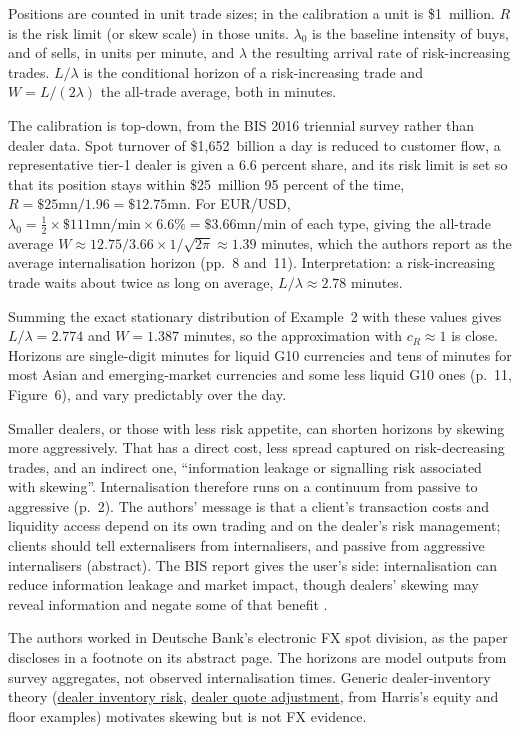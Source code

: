 \begin{qfmodel}
 Positions are counted in unit trade sizes; in the calibration a unit is \$1~million. $R$ is the risk limit (or skew scale) in those units. $\lambda_0$ is the baseline intensity of buys, and of sells, in units per minute, and $\lambda$ the resulting arrival rate of risk-increasing trades. $L/\lambda$ is the conditional horizon of a risk-increasing trade and $W=L/(2\lambda)$ the all-trade average, both in minutes.

 The calibration is top-down, from the BIS 2016 triennial survey rather than dealer data. Spot turnover of \$1{,}652~billion a day is reduced to customer flow, a representative tier-1 dealer is given a 6.6 percent share, and its risk limit is set so that its position stays within \$25~million 95 percent of the time, $R=\$25\text{mn}/1.96=\$12.75$mn. For EUR/USD, $\lambda_0=\tfrac12\times\$111\text{mn/min}\times6.6\%=\$3.66$mn/min of each type, giving the all-trade average $W\approx12.75/3.66\times1/\sqrt{2\pi}\approx1.39$ minutes, which the authors report as the average internalisation horizon (pp.~8 and~11). Interpretation: a risk-increasing trade waits about twice as long on average, $L/\lambda\approx2.78$ minutes.

Summing the exact stationary distribution of Example~2 with these values gives $L/\lambda=2.774$ and $W=1.387$ minutes, so the approximation with $c_R\approx1$ is close. Horizons are single-digit minutes for liquid G10 currencies and tens of minutes for most Asian and emerging-market currencies and some less liquid G10 ones (p.~11, Figure~6), and vary predictably over the day.

 Smaller dealers, or those with less risk appetite, can shorten horizons by skewing more aggressively. That has a direct cost, less spread captured on risk-decreasing trades, and an indirect one, ``information leakage or signalling risk associated with skewing''. Internalisation therefore runs on a continuum from passive to aggressive (p.~2). The authors' message is that a client's transaction costs and liquidity access depend on its own trading and on the dealer's risk management; clients should tell externalisers from internalisers, and passive from aggressive internalisers (abstract). The BIS report gives the user's side: internalisation can reduce information leakage and market impact, though dealers' skewing may reveal information and negate some of that benefit \citep[p.~27]{exp-fx-algos}.

 The authors worked in Deutsche Bank's electronic FX spot division, as the paper discloses in a footnote on its abstract page. The horizons are model outputs from survey aggregates, not observed internalisation times. Generic dealer-inventory theory (\hyperref[def:dealer-inventory-risk]{dealer inventory risk}, \hyperref[meth:dealer-quote-adjustment]{dealer quote adjustment}, from Harris's equity and floor examples) motivates skewing but is not FX evidence.


\end{qfmodel}
